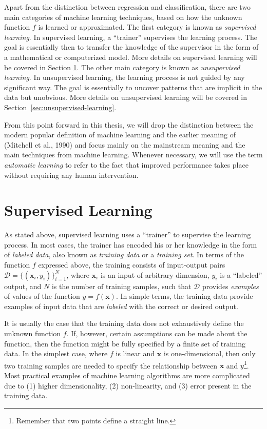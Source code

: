 Apart from the distinction between regression and classification, there are two main categories of machine learning techniques, based on how the unknown function $f$ is learned or approximated. The first category is known as \emph{supervised learning}. In supervised learning, a ``trainer'' supervises the learning process. The goal is essentially then to transfer the knowledge of the supervisor in the form of a mathematical or computerized model. More details on supervised learning will be covered in Section \ref{sec:supervised-learning}. The other main category is known as \emph{unsupervised learning}. In unsupervised learning, the learning process is not guided by any significant way. The goal is essentially to uncover patterns that are implicit in the data but unobvious.   More details on unsupervised learning will be covered in Section~\ref{sec:unsupervised-learning}.

From this point forward in this thesis, we will drop the distinction between the modern popular definition of machine learning and the earlier meaning of (Mitchell et al., 1990) and focus mainly on the mainstream meaning and the main techniques from machine learning. Whenever necessary, we will use the term \emph{automatic learning} to refer to the fact that improved performance takes place without requiring any human intervention.
%
\section{Supervised Learning}
\label{sec:supervised-learning}
%
As stated above, supervised learning uses a ``trainer'' to supervise the learning process. In most cases, the trainer has encoded his or her knowledge in the form of \emph{labeled data}, also known as \emph{training data} or a \emph{training set}. In terms of the function $f$ expressed above, the training consists of input-output pairs $\mathcal{D} = \{(\mathbf{x}_i, y_i)\}_{i=1}^N $, where $\mathbf{x}_i$ is an input of arbitrary dimension, $y_i$ is a ``labeled'' output, and $N$ is the number of training samples, such that $\mathcal{D}$ provides \emph{examples} of values of the function $y = f(\mathbf{x})$. In simple terms, the training data provide examples of input data that are \emph{labeled} with the correct or desired output.

It is usually the case that the training data does not exhaustively define the unknown function $f$. If, however, certain assumptions can be made about the function, then the function might be fully specified by a finite set of training data. In the simplest case, where $f$ is linear and $\mathbf{x}$ is one-dimensional, then only two training samples are needed to specify the relationship between $\mathbf{x}$ and $y$\footnote{Remember that two points define a straight line.}. Most practical examples of machine learning algorithms are more complicated due to (1) higher dimensionality, (2) non-linearity, and (3) error present in the training data.

